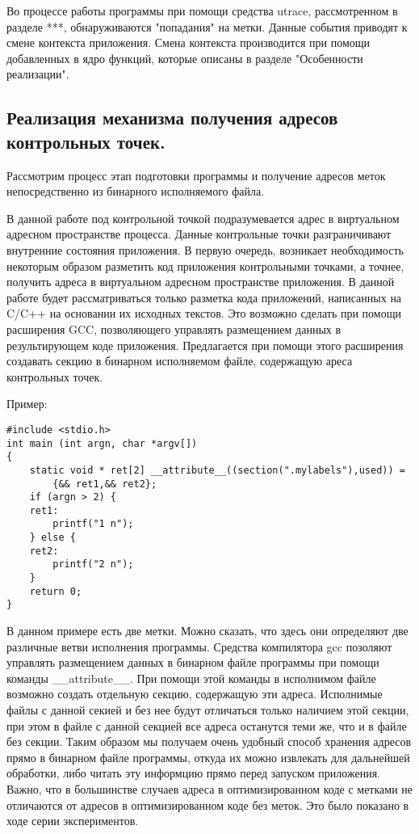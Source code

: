 Во процессе работы программы при помощи 
средства utrace, рассмотренном в разделе ***, 
обнаруживаются "попадания" на метки. Данные 
события приводят к смене контекста приложения. 
Смена контекста производится при помощи добавленных 
в ядро функций, которые описаны в разделе "Особенности 
реализации". 

\bigskip 
\subsection{Реализация механизма получения
	адресов контрольных точек.}

Рассмотрим процесс этап подготовки программы 
и получение адресов меток непосредственно из 
бинарного исполняемого файла. 

В данной работе под контрольной точкой 
подразумевается адрес в виртуальном 
адресном пространстве процесса. 
Данные контрольные точки разграничивают
внутренние состояния приложения.  
В первую очередь, возникает необходимость 
некоторым образом разметить код приложения 
контрольными точками, а точнее, получить адреса 
в виртуальном адресном пространстве приложения. 
В данной работе будет рассматриваться только
разметка кода приложений, написанных на C/C++ 
на основании их исходных текстов. Это возможно 
сделать при помощи  расширения GCC, позволяющего
управлять размещением данных в результирующем 
коде приложения. Предлагается при помощи 
этого расширения создавать секцию в бинарном 
исполняемом файле, содержащую ареса 
контрольных точек.

Пример: 

\bigskip
\begin{lstlisting}
#include <stdio.h>
int main (int argn, char *argv[])
{ 
	static void * ret[2] __attribute__((section(".mylabels"),used)) = 
		{&& ret1,&& ret2};
	if (argn > 2) {
	ret1:
		printf("1 n");
	} else {
	ret2:
		printf("2 n");
	}	
	return 0;
}
\end{lstlisting}

\bigskip
В данном примере есть две метки. Можно сказать, что 
здесь они определяют две различные ветви исполнения 
программы. Средства компилятора gcc позоляют управлять 
размещением данных в бинарном файле программы при помощи 
команды \_\_attribute\_\_. При помощи этой команды в исполнимом 
файле возможно создать отдельную секцию, содержащую эти адреса. 
Исполнимые файлы с данной секией и без нее будут отличаться 
только наличием этой секции, при этом в файле с данной секцией 
все адреса останутся теми же, что и в файле без секции. Таким 
образом мы получаем очень удобный способ хранения адресов прямо 
в бинарном файле программы, откуда их можно извлекать для 
дальнейшей обработки, либо читать эту информцию прямо перед 
запуском приложения. Важно, что в большинстве случаев адреса 
в оптимизированном коде с метками не отличаются от адресов в оптимизированном 
коде без меток. Это было показано в ходе серии экспериментов. 

